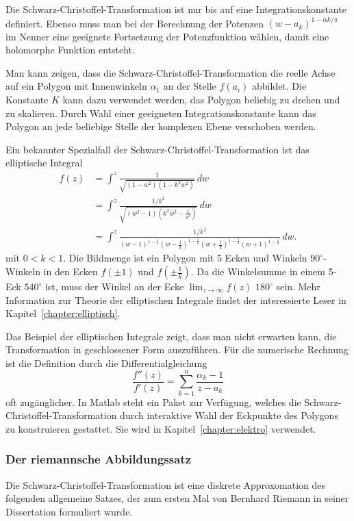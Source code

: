 Die Schwarz-Christoffel-Transformation ist nur bis auf eine
Integrationskonstante definiert.
Ebenso muss man bei der Berechnung der Potenzen $(w-a_k)^{1-\alpha k/\pi}$
im Nenner eine geeignete Fortsetzung der Potenzfunktion wählen, damit
eine holomorphe Funktion entsteht.

Man kann zeigen, dass die Schwarz-Christoffel-Transformation die reelle Achse
auf ein Polygon mit Innenwinkeln $\alpha_1$ an der Stelle $f(a_i)$ abbildet.
Die Konstante $K$ kann dazu verwendet werden, das Polygon beliebig zu drehen
und zu skalieren.
Durch Wahl einer geeigneten Integrationskonstante kann das Polygon an
jede beliebige Stelle der komplexen Ebene verschoben werden.

Ein bekannter Spezialfall der Schwarz-Christoffel-Transformation ist
das elliptische Integral
\begin{align*}
f(z)
&=
\int^z
\frac{1}{\!\sqrt{(1-w^2)(1-k^2w^2)}}\,dw
\\
&=
\int^z 
\frac{1/k^2}{\!\sqrt{(w^2-1)(k^2w^2-\frac{1}{k^2})}}\,dw
\\
&=
\int^z
\frac{1/k^2}{
(w-1)^{1-\frac12}
(w-\frac{1}{k})^{1-\frac12}
(w+\frac{1}{k})^{1-\frac12}
(w+1)^{1-\frac12}
}\,dw.
\end{align*}
mit $0<k<1$.
Die Bildmenge ist ein Polygon mit 5 Ecken und Winkeln $90^\circ$-Winkeln
in den Ecken $f(\pm 1)$ und $f(\pm\frac{1}{k})$.
Da die Winkelsumme in einem 5-Eck $540^\circ$ ist, muss der Winkel
an der Ecke $\lim_{z\to\infty}f(z)$ $180^\circ$ sein.
Mehr Information zur Theorie der elliptischen Integrale findet der
interessierte Leser in Kapitel~\ref{chapter:elliptisch}.

Das Beispiel der elliptischen Integrale zeigt, dass man nicht erwarten
kann, die Transformation in geschlossener Form auszuführen.
Für die numerische Rechnung ist die Definition durch die Differentialgleichung
\[
\frac{f''(z)}{f'(z)}
=
\sum_{k=1}^n \frac{\alpha_k-1}{z-a_k}
\]
oft zugänglicher.
In Matlab steht ein Paket zur Verfügung, welches die
Schwarz-Christoffel-Transformation durch interaktive Wahl der Eckpunkte
des Polygons zu konstruieren gestattet.
%
Sie wird in Kapitel~\ref{chapter:elektro} verwendet.

%
%
\subsubsection{Der riemannsche Abbildungssatz}
Die Schwarz-Christoffel-Transformation ist eine diskrete Approxomation
des folgenden allgemeine Satzes, der zum ersten Mal von
Bernhard Riemann
%
in seiner Dissertation formuliert wurde.

